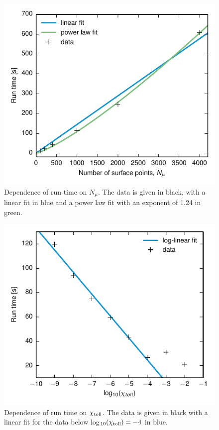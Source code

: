 \documentclass[11pt, oneside]{article}   	%
\begin{document}
\begin{figure}[]
   \centering
   \includegraphics[]{Figures/Run_time_Nmu.pdf} 
   \caption{Dependence of run time on $N_{\mu}$. The data is given in black, with a linear fit in blue and a power law fit with an exponent of 1.24 in green.}
   \label{HUG:fig:run_time_Nmu}
\end{figure}

\begin{figure}[]
   \centering
   \includegraphics[]{Figures/Run_time_toll.pdf} 
   \caption{Dependence of run time on $\chi_{\rm toll}$. The data is given in black with a linear fit for the data below log$_{10}(\chi_{\rm toll})=-4$ in blue.}
   \label{HUG:fig:run_time_toll}
\end{figure}
\end{document}
